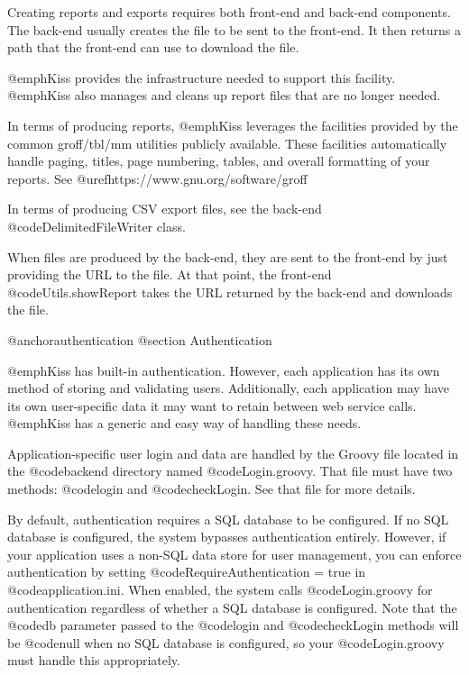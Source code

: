 Creating reports and exports requires both front-end and back-end components.
The back-end usually creates the file to be sent to the front-end.  It then returns
a path that the front-end can use to download the file.

@emph{Kiss} provides the infrastructure needed to support this facility.
@emph{Kiss} also manages and cleans up report files that are no longer needed.

In terms of producing reports, @emph{Kiss} leverages the facilities
provided by the common groff/tbl/mm utilities publicly available.
These facilities automatically handle paging, titles, page numbering,
tables, and overall formatting of your reports. See
@uref{https://www.gnu.org/software/groff}

In terms of producing CSV export files, see the back-end
@code{DelimitedFileWriter} class.

When files are produced by the back-end, they are sent to the
front-end by just providing the URL to the file.  At that point, the
front-end @code{Utils.showReport} takes the URL returned by the back-end
and downloads the file.

@anchor{authentication}
@section Authentication

@emph{Kiss} has built-in authentication.  However, each application has its
own method of storing and validating users.  Additionally, each application
may have its own user-specific data it may want to retain between web service
calls. @emph{Kiss} has a generic and easy way of handling these needs.

Application-specific user login and data are handled by the Groovy file
located in the @code{backend} directory named @code{Login.groovy}.
That file must have two methods: @code{login} and @code{checkLogin}.
See that file for more details.

By default, authentication requires a SQL database to be configured.
If no SQL database is configured, the system bypasses authentication
entirely.  However, if your application uses a non-SQL data store
for user management, you can enforce authentication by
setting @code{RequireAuthentication = true} in @code{application.ini}.
When enabled, the system calls @code{Login.groovy} for authentication
regardless of whether a SQL database is configured.  Note that the
@code{db} parameter passed to the @code{login} and @code{checkLogin}
methods will be @code{null} when no SQL database is configured, so
your @code{Login.groovy} must handle this appropriately.

